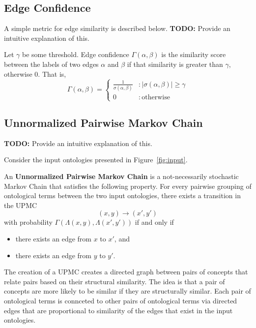 \documentclass[letterpaper,twocolumn,12pt]{article}
\begin{document}
\subsection{Edge Confidence}

A simple metric for edge similarity is described below.
\textbf{TODO:} Provide an intuitive explanation of this.

\begin{defn}
Let $\gamma$ be some threshold. Edge confidence $\Gamma \left( \alpha, \beta \right)$ is the similarity score between the labels of two edges $\alpha$ and $\beta$ if that similarity is greater than $\gamma$, otherwise $0$. That is,
$$ \Gamma \left( \alpha, \beta \right) = \left\{
   	 \begin{array}{ll}
           \frac{1}{\sigma \left( \alpha, \beta \right)} & : \vert \sigma \left( \alpha, \beta \right) \vert \geq \gamma \\
           0                                             & : \mathrm{otherwise}
     \end{array}
   \right.$$
\end{defn}

\subsection{Unnormalized Pairwise Markov Chain}
\textbf{TODO:} Provide an intuitive explanation of this.

Consider the input ontologies presented in Figure~\ref{fig:input}.

\begin{defn}
An {\bf Unnormalized Pairwise Markov Chain} is a not-necessarily stochastic Markov Chain that satisfies the following property.
For every pairwise grouping of ontological terms between the two input ontologies, there exists a transition in the UPMC
$$ (x, y) \rightarrow (x', y') $$
with probability $\Gamma(\Lambda(x, y), \Lambda(x', y'))$ if and only if
\begin{itemize}
\item there exists an edge from $x$ to $x'$, and
\item there exists an edge from $y$ to $y'$.
\end{itemize}
\end{defn}

The creation of a UPMC creates a directed graph between pairs of concepts that relate 
pairs based on their structural similarity.
The idea is that a pair of concepts are more likely to be similar if they are structurally similar.
Each pair of ontological terms is connceted to other pairs of ontological terms via directed 
edges that are proportional to similarity of the edges that exist in the input ontologies. 
\end{document}
